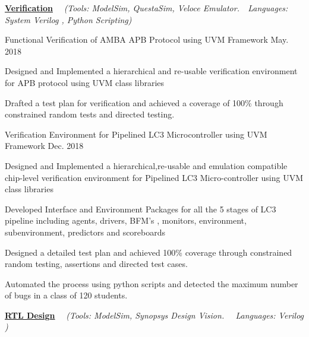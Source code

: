 \begin{flushleft}
  \par\addvspace{-1.5mm}
  \fontsize{10.4pt}{1em}\selectfont\underline{\textbf{\color{black}Verification}} \ \ \textit{(\color{text}Tools: ModelSim, QuestaSim, Veloce Emulator.\ \ Languages: System Verilog , Python Scripting)}
\end{flushleft}
\par\addvspace{-0.7ex}
\begin{cvprojects}
  \cvproject
    {Functional Verification of AMBA APB Protocol using UVM Framework} 
    {\color{darkgray}May. 2018}
    {
      \begin{cvprojectitems}
        \item {Designed and Implemented a hierarchical and re-usable verification environment for APB protocol using UVM class libraries}
        \item {Drafted a test plan for verification and achieved a coverage of 100\% through constrained random tests and directed testing. }
      \end{cvprojectitems}
    }
  \cvproject
    {Verification Environment for Pipelined LC3 Microcontroller using UVM Framework }
    {\color{darkgray}Dec. 2018}
    {
      \begin{cvprojectitems}
        \item {Designed and Implemented a hierarchical,re-usable and emulation compatible chip-level verification environment for Pipelined LC3 Micro-controller using UVM class libraries}
        \item {Developed Interface and Environment Packages for all the 5 stages of LC3 pipeline including agents, drivers, BFM's , monitors, environment, subenvironment, predictors and scoreboards}
        \item {Designed a detailed test plan and achieved 100\% coverage through constrained random testing, assertions and directed test cases.}
        \item {Automated the process using python scripts and detected the maximum number of bugs in a class of 120 students.}
      \end{cvprojectitems}
    }
    \par\addvspace{3ex}
    \begin{flushleft}
    \par\addvspace{-1.5mm}
    \fontsize{10.4pt}{1em}\selectfont\underline{\textbf{\color{black}RTL Design}} \ \ \textit{(\color{text}Tools: ModelSim, Synopsys Design Vision. \ \ Languages: Verilog )}

\end{flushleft}
\end{cvprojects}
